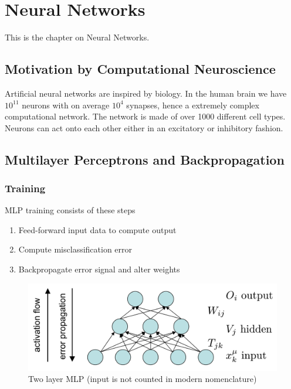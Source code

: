 \documentclass[main]{subfiles}
\begin{document}

\section{Neural Networks}
This is the chapter on Neural Networks.
\subsection{Motivation by Computational Neuroscience}
Artificial neural networks are inspired by biology. In the human brain we have $10^11$ neurons with on average $10^4$ synapses, hence a extremely complex computational network. The network is made of over 1000 different cell types. Neurons can act onto each other either in an excitatory or inhibitory fashion.

\subsection{Multilayer Perceptrons and Backpropagation}



\subsubsection{Training}
MLP training consists of these steps
\begin{enumerate}
\item Feed-forward input data to compute output
\item Compute misclassification error
\item Backpropagate error signal and alter weights



\end{enumerate}
\begin{figure}[H]
\centering
\includegraphics[width=0.7\linewidth]{figs/NN_Data_Flow}
\caption{Two layer MLP (input is not counted in modern nomenclature)}
\end{figure}
\end{document}
